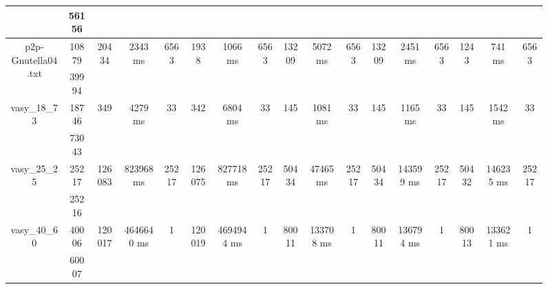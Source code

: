 \documentclass[../master/master.tex]{subfiles}
\begin{document}
\begin{figure}
\begin{adjustbox}{angle=90}
\begin{tabular}{ |c|c||c|c|c||c|c|c||c|c|c||c|c|c||c|c|c|| }
\cline{2-2}
 & 56156  &  &  &  &  &  &  &  &  &  &  &  &  &  &  &  \\
\hline
\multirow{2}{3.6em}{p2p-Gnutella04.txt} & 10879 & \multirow{2}{3.6em}{20434} & \multirow{2}{3.6em}{2343 ms} & \multirow{2}{3.6em}{6563} & \multirow{2}{3.6em}{1938} & \multirow{2}{3.6em}{1066 ms} & \multirow{2}{3.6em}{6563} & \multirow{2}{3.6em}{13209} & \multirow{2}{3.6em}{5072 ms} & \multirow{2}{3.6em}{6563} & \multirow{2}{3.6em}{13209} & \multirow{2}{3.6em}{2451 ms} & \multirow{2}{3.6em}{6563} & \multirow{2}{3.6em}{1243} & \multirow{2}{3.6em}{741 ms} & \multirow{2}{3.6em}{6563} \\
\cline{2-2}
 & 39994  &  &  &  &  &  &  &  &  &  &  &  &  &  &  &  \\
\hline
\multirow{2}{3.6em}{vasy\_18\_73} & 18746 & \multirow{2}{3.6em}{349} & \multirow{2}{3.6em}{4279 ms} & \multirow{2}{3.6em}{33} & \multirow{2}{3.6em}{342} & \multirow{2}{3.6em}{6804 ms} & \multirow{2}{3.6em}{33} & \multirow{2}{3.6em}{145} & \multirow{2}{3.6em}{1081 ms} & \multirow{2}{3.6em}{33} & \multirow{2}{3.6em}{145} & \multirow{2}{3.6em}{1165 ms} & \multirow{2}{3.6em}{33} & \multirow{2}{3.6em}{145} & \multirow{2}{3.6em}{1542 ms} & \multirow{2}{3.6em}{33} \\
\cline{2-2}
 & 73043  &  &  &  &  &  &  &  &  &  &  &  &  &  &  &  \\
\hline
\multirow{2}{3.6em}{vasy\_25\_25} & 25217 & \multirow{2}{3.6em}{126083} & \multirow{2}{3.6em}{823968 ms} & \multirow{2}{3.6em}{25217} & \multirow{2}{3.6em}{126075} & \multirow{2}{3.6em}{827718 ms} & \multirow{2}{3.6em}{25217} & \multirow{2}{3.6em}{50434} & \multirow{2}{3.6em}{47465 ms} & \multirow{2}{3.6em}{25217} & \multirow{2}{3.6em}{50434} & \multirow{2}{3.6em}{143599 ms} & \multirow{2}{3.6em}{25217} & \multirow{2}{3.6em}{50432} & \multirow{2}{3.6em}{146235 ms} & \multirow{2}{3.6em}{25217} \\
\cline{2-2}
 & 25216  &  &  &  &  &  &  &  &  &  &  &  &  &  &  &  \\
\hline
\multirow{2}{3.6em}{vasy\_40\_60} & 40006 & \multirow{2}{3.6em}{120017} & \multirow{2}{3.6em}{4646640 ms} & \multirow{2}{3.6em}{1} & \multirow{2}{3.6em}{120019} & \multirow{2}{3.6em}{4694944 ms} & \multirow{2}{3.6em}{1} & \multirow{2}{3.6em}{80011} & \multirow{2}{3.6em}{133708 ms} & \multirow{2}{3.6em}{1} & \multirow{2}{3.6em}{80011} & \multirow{2}{3.6em}{136794 ms} & \multirow{2}{3.6em}{1} & \multirow{2}{3.6em}{80013} & \multirow{2}{3.6em}{133621 ms} & \multirow{2}{3.6em}{1} \\
\cline{2-2}
 & 60007  &  &  &  &  &  &  &  &  &  &  &  &  &  &  &  \\

\end{tabular}
\end{adjustbox}
\end{figure}
\end{document}
